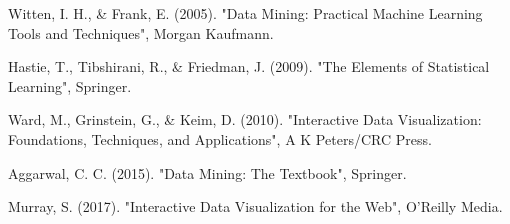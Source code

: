 \documentclass[conference]{IEEEtran}
\begin{document}

\begin{thebibliography}{00}
 Witten, I. H., \& Frank, E. (2005). "Data Mining: Practical Machine Learning Tools and Techniques", Morgan Kaufmann.

 Hastie, T., Tibshirani, R., & Friedman, J. (2009). "The Elements of Statistical Learning", Springer.

 Ward, M., Grinstein, G., & Keim, D. (2010). "Interactive Data Visualization: Foundations, Techniques, and Applications", A K Peters/CRC Press.

 Aggarwal, C. C. (2015). "Data Mining: The Textbook", Springer.

 Murray, S. (2017). "Interactive Data Visualization for the Web", O'Reilly Media.
\end{thebibliography}
\end{document}
